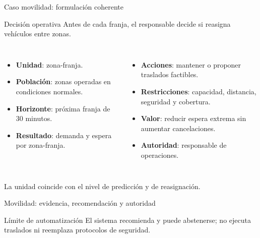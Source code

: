 \documentclass[aspectratio=169,11pt]{beamer}
\newcommand{\concepto}[1]{\textcolor{UAPTeal}{\textbf{#1}}}
\newcommand{\br}{\\}
\begin{document}
\begin{frame}{Caso movilidad: formulación coherente}
  \begin{block}{Decisión operativa}
    Antes de cada franja, el responsable decide si reasigna vehículos entre zonas.
  \end{block}
  \small
  \begin{columns}[T]
      \begin{itemize}
        \item \concepto{Unidad}: zona-franja.
        \item \concepto{Población}: zonas operadas en condiciones normales.
        \item \concepto{Horizonte}: próxima franja de 30 minutos.
        \item \concepto{Resultado}: demanda y espera por zona-franja.
      \end{itemize}
      \begin{itemize}
        \item \concepto{Acciones}: mantener o proponer traslados factibles.
        \item \concepto{Restricciones}: capacidad, distancia, seguridad y cobertura.
        \item \concepto{Valor}: reducir espera extrema sin aumentar cancelaciones.
        \item \concepto{Autoridad}: responsable de operaciones.
      \end{itemize}
  \end{columns}
  \centering\alert{La unidad coincide con el nivel de predicción y de reasignación.}
\end{frame}

\begin{frame}{Movilidad: evidencia, recomendación y autoridad}
  \centering
  \vfill
  \begin{alertblock}{Límite de automatización}
    El sistema recomienda y puede abstenerse; no ejecuta traslados ni reemplaza protocolos de seguridad.
  \end{alertblock}
\end{frame}
\end{document}
